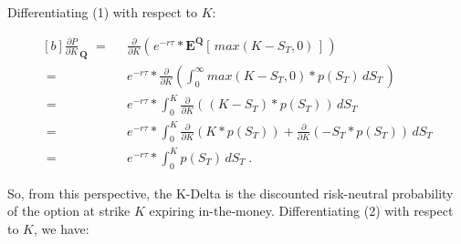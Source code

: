 \documentclass[12pt]{article}
\begin{document}
\vspace{15pt}

\indent Differentiating (1) with respect to $K$:

\vspace{15pt}

\begin{equation}
\begin{aligned}[b]
\frac{\partial P}{\partial K}_{\hspace{1pt}\mathbf{Q}}   \hspace{4pt} =& \hspace{7pt}   \frac{\partial}{\partial K}(\hspace{1pt} e^{-r \tau} * \mathbf{E^{Q}}[\hspace{2pt} max(K-S_{T},0) \hspace{2pt}] \hspace{1pt})
\\[12pt]
\hspace{4pt} =& \hspace{7pt}   e^{-r \tau} * \frac{\partial}{\partial K}(\int_{0}^{\infty} max(K-S_{T},0) * p(S_{T}) \hspace{2pt} dS_{T} \hspace{2pt} )
\\[12pt]
\hspace{4pt} =& \hspace{7pt}   e^{-r \tau} * \int_{0}^{K} \frac{\partial}{\partial K}(\hspace{1pt} (K-S_{T}) * p(S_{T}) \hspace{1pt}) \hspace{2pt} dS_{T}
\\[12pt]
\hspace{4pt} =& \hspace{7pt}   e^{-r \tau} * \int_{0}^{K} \frac{\partial}{\partial K}(K * p(S_{T})) + \frac{\partial}{\partial K}(-S_{T} * p(S_{T})) \hspace{2pt} dS_{T}
\\[12pt]
\hspace{4pt} =& \hspace{7pt}   e^{-r \tau} * \int_{0}^{K} p(S_{T}) \hspace{2pt} dS_{T} \hspace{3pt}.
\end{aligned}
\end{equation}

\vspace{10pt}

\begin{paragraph}
\indent So, from this perspective, the K-Delta is the discounted risk-neutral probability of the option at strike $K$ expiring in-the-money. Differentiating (2) with respect to $K$, we have:
\end{paragraph}
\end{document}
